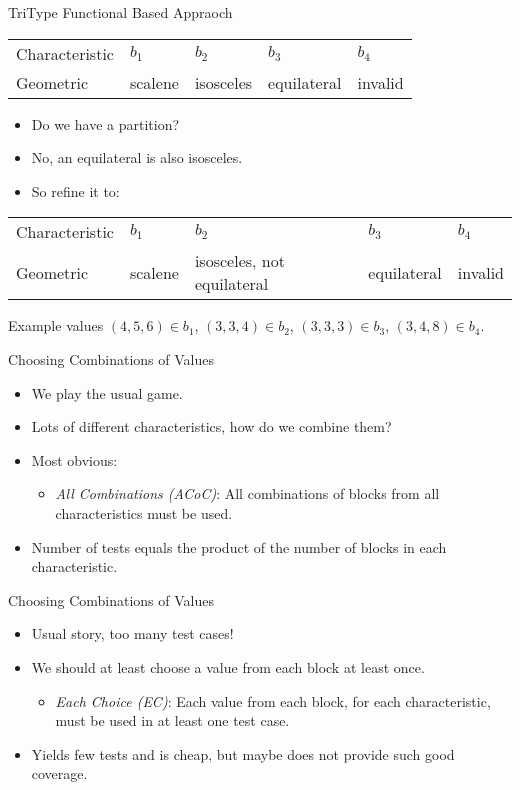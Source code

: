 \documentclass{beamer}
\begin{document}
\begin{frame}{TriType  Functional Based Appraoch}
  \begin{tabular}{||l|l|l|l|l||}\hline 
    Characteristic & $b_1$  & $b_2$ & $b_3$ & $b_4$\\
    Geometric  &  scalene & isosceles &
    equilateral & invalid \\
    \hline
  \end{tabular}
  \begin{itemize}
  \item Do we have a partition? 
  \item No, an equilateral is also isosceles.
  \item So refine it to:
  \end{itemize}
{\small
  \begin{tabular}{||l|l|l|l|l||}\hline 
    Characteristic & $b_1$  & $b_2$ & $b_3$ & $b_4$\\
    Geometric  &  scalene & isosceles, not equilateral &
    equilateral & invalid \\
    \hline
  \end{tabular}
}
Example values $(4,5,6) \in b_1$,  $(3,3,4) \in b_2$, $(3,3,3) \in
b_3$, $(3,4,8) \in b_4$.
\end{frame}
\begin{frame}{Choosing Combinations of Values}

  \begin{itemize}
  \item We play the usual game.
  \item Lots of different characteristics, how do we combine them?
  \item Most obvious:
    \begin{itemize}
    \item {\em All Combinations (ACoC)}: All combinations of blocks from all
      characteristics must be used.
    \end{itemize}
  \item Number of tests equals the product of the number of blocks in each
    characteristic. 
  \end{itemize}
  \end{frame}
\begin{frame}{Choosing Combinations of Values}
  \begin{itemize}
  \item Usual story, too many test cases!
  \item We should at least choose a value from each block at least once.
    \begin{itemize}
    \item {\em Each Choice (EC)}: Each value from each block, for each
      characteristic, must be used in at least one test case.
    \end{itemize}
  \item Yields few tests and is cheap, but maybe does not provide such good coverage.
  \end{itemize}
\end{frame}
\end{document}
